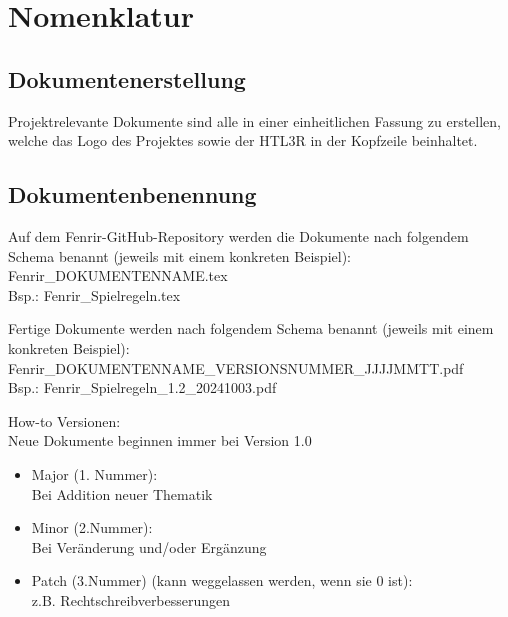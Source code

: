 \documentclass[
	headings=optiontotocandhead,%
	oneside,
	numbers=noenddot,%
	toc=flat, %
	10pt, %
	parskip=full, %
	listof=totoc, %
	listof=flat, %
	numbers=noenddot, %
	bibliography=totoc, %
	a4paper,DIV=14,
]{scrartcl}
\begin{document}
\section{Nomenklatur}
\subsection{Dokumentenerstellung}
Projektrelevante Dokumente sind alle in einer einheitlichen Fassung zu erstellen, welche das Logo des Projektes sowie der HTL3R in der Kopfzeile beinhaltet.

\subsection{Dokumentenbenennung}
Auf dem Fenrir-GitHub-Repository werden die Dokumente nach folgendem Schema benannt (jeweils mit einem konkreten Beispiel): \\
Fenrir\_DOKUMENTENNAME.tex \\
Bsp.: Fenrir\_Spielregeln.tex

Fertige Dokumente werden nach folgendem Schema benannt (jeweils mit einem konkreten Beispiel): \\
Fenrir\_DOKUMENTENNAME\_VERSIONSNUMMER\_JJJJMMTT.pdf \\
Bsp.: Fenrir\_Spielregeln\_1.2\_20241003.pdf

How-to Versionen:\\
Neue Dokumente beginnen immer bei Version 1.0
\begin{itemize}
\item{Major (1. Nummer):}\\
Bei Addition neuer Thematik

\item{Minor (2.Nummer):}\\
Bei Veränderung und/oder Ergänzung

\item{Patch (3.Nummer) (kann weggelassen werden, wenn sie 0 ist):}\\
z.B. Rechtschreibverbesserungen
\end{itemize}
\end{document}
